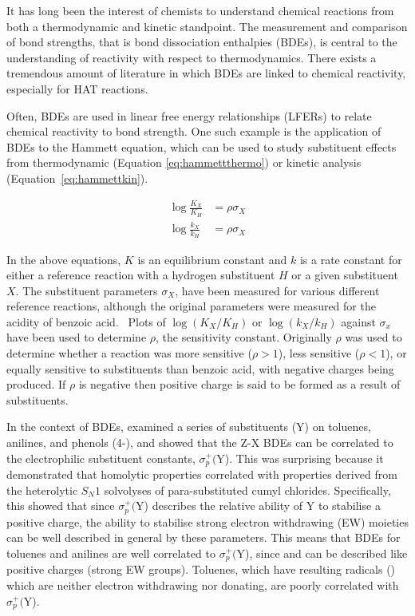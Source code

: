 It has long been the interest of chemists to understand chemical reactions from
both a thermodynamic and kinetic standpoint. The measurement and comparison of
bond strengths, that is bond dissociation enthalpies (BDEs), is central to the
understanding of reactivity with respect to thermodynamics. There exists a
tremendous amount of literature in which BDEs are linked to chemical reactivity,
especially for HAT
reactions.\cite{Kochi1973,Tedder1982,Wijtmans2003,Pratt2004,Mayer2004}

Often, BDEs are used in linear free energy relationships (LFERs) to relate
chemical reactivity to bond strength. One such example\cite{Pratt2004} is the
application of BDEs to the Hammett equation\cite{Anslyn2006}, which can be used
to study substituent effects from thermodynamic (Equation
\ref{eq:hammettthermo}) or kinetic analysis (Equation~\ref{eq:hammettkin}).

\begin{align}
 \log\frac{K_X}{K_H} &= \rho \sigma_X \label{eq:hammettthermo} \\
 \log\frac{k_X}{k_H} &= \rho \sigma_X \label{eq:hammettkin}
\end{align}

\noindent In the above equations, $K$ is an equilibrium constant and $k$ is a
rate constant for either a reference reaction with a hydrogen substituent $H$ or
a given substituent $X$. The substituent parameters $\sigma_X$, have been
measured for various different reference reactions, although the original
parameters were measured for the acidity of benzoic acid.\cite{Hammett1937}
~Plots of $\log(K_X/K_H)$ or $\log(k_X/k_H)$ against $\sigma_x$ have been used
to determine $\rho$, the sensitivity constant. Originally $\rho$ was used to
determine whether a reaction was more sensitive ($\rho > 1$), less sensitive
($\rho < 1$), or equally sensitive to substituents than benzoic acid, with
negative charges being produced. If $\rho$ is negative then positive charge is
said to be formed as a result of substituents.

In the context of BDEs, \citet{Pratt2004} examined a series of substituents (Y)
on toluenes, anilines, and phenols (4-), and showed that the Z-X
BDEs can be correlated to the electrophilic substituent constants,
$\sigma_p^+($Y). This was surprising because it demonstrated that homolytic
properties correlated with properties derived from the heterolytic $S_N1$
solvolyses of para-substituted cumyl chlorides.\cite{Brown1958} Specifically,
this showed that since $\sigma_p^+($Y) describes the relative ability of Y to
stabilise a positive charge, the ability to stabilise strong electron
withdrawing (EW) moieties can be well described in general by these
parameters. This means that BDEs for toluenes and anilines are well correlated
to $\sigma_p^+($Y), since  and  can be described like positive
charges (strong EW groups). Toluenes, which have resulting radicals ()
which are neither electron withdrawing nor donating, are poorly correlated with
$\sigma_p^+($Y).

